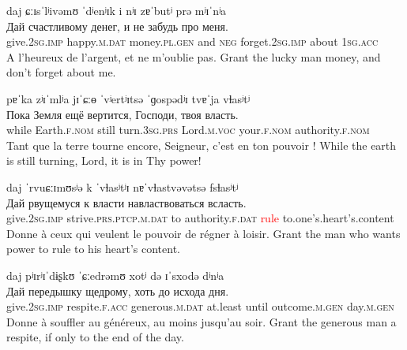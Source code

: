 \documentclass[12pt]{article}
\begin{document}
\begin{exe}
    \glll
    daj ɕːɪsˈlʲivəmʊ ˈdʲenʲɪk i nʲɪ zɐˈbutʲ prə mʲɪˈnʲa\\
    Дай счастливому денег, и не забудь про меня.\\
    give.2\textsc{sg.imp} happy.\textsc{m.dat} money.\textsc{pl.gen} and \textsc{neg} forget.2\textsc{sg.imp} about 1\textsc{sg.acc}\\
    \trans
    A l'heureux de l'argent, et ne m'oublie pas.
    \trans
    Grant the lucky man money, and don't forget about me.
\end{exe}

\dotfill

\begin{exe}
    \glll
    pɐˈka zʲɪˈmlʲa jɪˈɕːɵ ˈvʲertʲɪtsə ˈɡospədʲɪ tvɐˈja vɫasʲtʲ\\
    Пока Земля ещё вертится, Господи, твоя власть.\\
    while Earth.\textsc{f.nom} still turn.3\textsc{sg.prs} Lord.\textsc{m.voc} your.\textsc{f.nom} authority.\textsc{f.nom}\\
    \trans
    Tant que la terre tourne encore, Seigneur, c'est en ton pouvoir !
    \trans
    While the earth is still turning, Lord, it is in Thy power!
\end{exe}

\begin{exe}
    \glll
    daj ˈrvuɕːɪmʊsʲə k ˈvɫasʲtʲɪ nɐˈvɫastvəvətsə fsɫasʲtʲ\\
    Дай рвущемуся к власти {навластвоваться} всласть.\\
    give.2\textsc{sg.imp} strive.\textsc{prs.ptcp.m.dat} to authority.\textsc{f.dat} \textcolor{red}{rule} to.one's.heart's.content\\
    \trans
    Donne à ceux qui veulent le pouvoir de régner à loisir.
    \trans
    Grant the man who wants power to rule to his heart's content.
\end{exe}

\begin{exe}
    \glll
    daj pʲɪrʲɪˈdɨʂkʊ ˈɕːedrəmʊ xotʲ də ɪˈsxodə dʲnʲa\\
    Дай передышку щедрому, хоть до исхода дня.\\
    give.2\textsc{sg.imp} respite.\textsc{f.acc} generous.\textsc{m.dat} at.least until outcome.\textsc{m.gen} day.\textsc{m.gen}\\
    \trans
    Donne à souffler au généreux, au moins jusqu'au soir.
    \trans
    Grant the generous man a respite, if only to the end of the day.
\end{exe}
\end{document}
